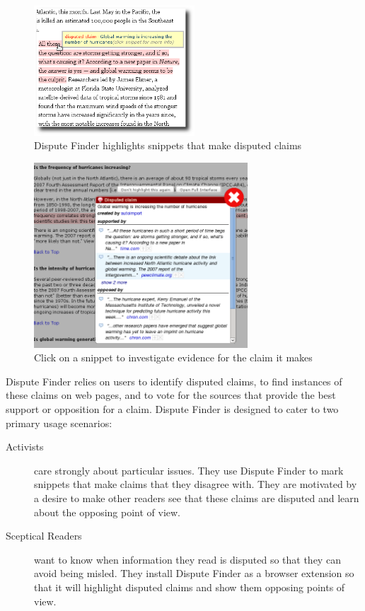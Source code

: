 \documentclass{www2010-submission}
\begin{document}
\begin{figure}[tb]
	\begin{center}
	\includegraphics[width=6cm]{../screenshots/v2_highlight_shadow.png}
	\caption{Dispute Finder highlights snippets that make disputed claims}
	\label{highlight}
	\end{center}
\end{figure}

\begin{figure}[tb]
	\begin{center}
	\includegraphics[width=8cm]{../screenshots/v2_popup_dim2.png}
	\caption{Click on a snippet to investigate evidence for the claim it makes}
	\label{claimview}
	\end{center}
\end{figure}

Dispute Finder relies on users to identify disputed claims, to find instances of these claims on web pages, and to vote for the sources that provide the best support or opposition for a claim. 
Dispute Finder is designed to cater to two primary usage scenarios:

\begin{description}
\item[Activists] care strongly about particular issues. They use Dispute Finder to mark snippets that make claims that they disagree with. They are motivated by a desire to make other readers see that these claims are disputed and learn about the opposing point of view.

\item[Sceptical Readers] want to know when information they read is disputed so that they can avoid being misled. They install Dispute Finder as a browser extension so that it will highlight disputed claims and show them opposing points of view.
\end{description}
\end{document}
